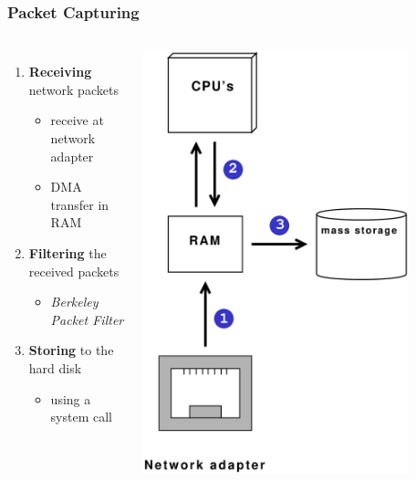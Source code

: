 \documentclass{beamer}
\begin{document}
\begin{frame}
\frametitle{Packet Capturing}
\begin{columns}
\vspace{-15em}
\begin{enumerate}
	\item \textbf{Receiving} network packets
		\begin{itemize}
			\item receive at network adapter
			\item DMA transfer in RAM \newline
		\end{itemize}
	\item \textbf{Filtering} the received packets 
		\begin{itemize}
			\item \emph{Berkeley Packet Filter}\newline
		\end{itemize}
	\item \textbf{Storing} to the hard disk
		\begin{itemize}
			\item using a system call
		\end{itemize}
\end{enumerate}
\includegraphics [width=0.82\textwidth, keepaspectratio]{pics/HardwareView}
\end{columns}
\end{frame}
\end{document}
